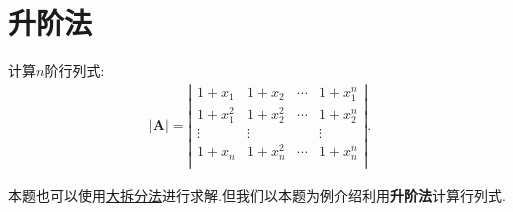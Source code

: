 \documentclass[../../main.tex]{subfiles}
\begin{document}
\section{升阶法}

\begin{example}\label{升阶法的应用(1)例题}
计算$n$阶行列式:
\begin{align*}
|\boldsymbol{A}|=\left| \begin{matrix}
1+x_1&		1+x_2&		\cdots&		1+x_{1}^{n}\\1+x_{1}^{2}
&		1+x_{2}^{2}&		\cdots&		1+x_{2}^{n}\\
\vdots&		\vdots&		&		\vdots\\
1+x_n&		1+x_{n}^{2}&		\cdots&		1+x_{n}^{n}\\
\end{matrix} \right|.
\end{align*}
\end{example}
\begin{note}
本题也可以使用\hyperref[大拆分法]{大拆分法}进行求解.但我们以本题为例介绍利用\textbf{升阶法}计算行列式.
\end{note}
\end{document}

